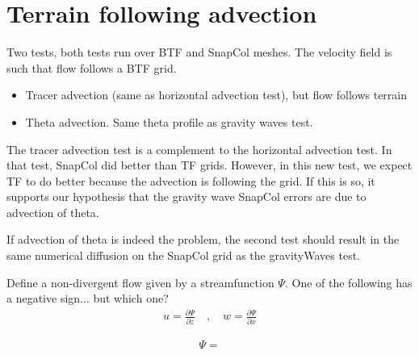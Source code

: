 \section{Terrain following advection}

Two tests, both tests run over BTF and SnapCol meshes.  The velocity field is such that flow follows a BTF grid.
\begin{itemize}
\item Tracer advection (same as horizontal advection test), but flow follows terrain
\item Theta advection.  Same theta profile as gravity waves test.  
\end{itemize}

The tracer advection test is a complement to the horizontal advection test.  In that test, SnapCol did better than TF grids.  However, in this new test, we expect TF to do better because the advection is following the grid.  If this is so, it supports our hypothesis that the gravity wave SnapCol errors are due to advection of theta.

If advection of theta is indeed the problem, the second test should result in the same numerical diffusion on the SnapCol grid as the gravityWaves test.

Define a non-divergent flow given by a streamfunction $\Psi$.  One of the following has a negative sign... but which one?
\begin{align}
u = \frac{\partial \Psi}{\partial z} \quad,\quad w = \frac{\partial \Psi}{\partial x}
\end{align}

\begin{align}
\Psi = 
\end{align}
